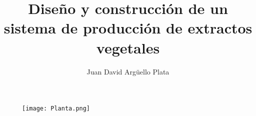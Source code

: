 \documentclass[12pt,letterpaper]{article}
\author{Juan David Argüello Plata}
\title{Diseño y construcción de un sistema de producción de extractos vegetales}
\begin{document}
\begin{landscape}
\begin{figure}[h!]
	\centering
	{\texttt{[image: Planta.png]}}
\end{figure}
\end{landscape}
\end{document}
